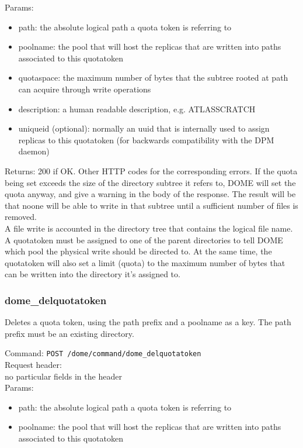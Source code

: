 \documentclass[a4paper,10pt]{scrreprt}
\begin{document}
Params:
\begin{itemize}
 \item path: the absolute logical path a quota token is referring to
 \item poolname: the pool that will host the replicas that are written into paths associated to this quotatoken
 \item quotaspace: the maximum number of bytes that the subtree rooted at path can acquire through write operations
 \item description: a human readable description, e.g. ATLASSCRATCH
 \item uniqueid (optional): normally an uuid that is internally used to assign replicas to this quotatoken (for backwards compatibility with the DPM daemon)
\end{itemize}

Returns: 200 if OK. Other HTTP codes for the corresponding errors. If the quota being set exceeds the size of the directory subtree it refers to, DOME will set the quota anyway, and give a warning in the body of the response. The result will be that noone will be able to write in that subtree until a sufficient number of files is removed.\\

A file write is accounted in the directory tree that contains the logical file name. A quotatoken must be assigned to one of the parent directories to tell DOME which pool the physical write should be directed to.
At the same time, the quotatoken will also set a limit (quota) to the maximum number of bytes that can be written into the directory it's assigned to.

\subsubsection{dome\_delquotatoken}
Deletes a quota token, using the path prefix and a poolname as a key. The path prefix must be an existing directory.

Command:
\lstinline"POST /dome/command/dome_delquotatoken"\\

Request header:\\
no particular fields in the header\\

Params:\\
\begin{itemize}
 \item path: the absolute logical path a quota token is referring to
 \item poolname: the pool that will host the replicas that are written into paths associated to this quotatoken
\end{itemize}
\end{document}
